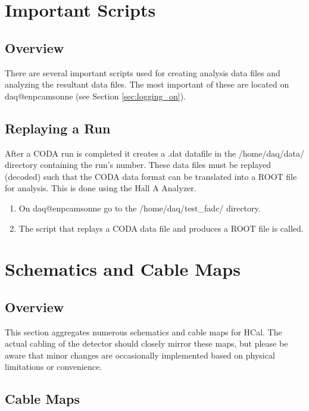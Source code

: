 \documentclass[oneside]{book}   %
\begin{document}
\chapter{Important Scripts}
\label{ch:scripts}

\section{Overview}
\label{sec:scripts_overview}

There are several important scripts used for creating analysis data files and analyzing the resultant data files. The most important of these are located on daq@enpcamsonne (see Section \cref{sec:logging_on}).

\section{Replaying a Run}
\label{sec:replay}

After a CODA run is completed it creates a .dat datafile in the /home/daq/data/ directory containing the run's number. These data files must be replayed (decoded) such that the CODA data format can be translated into a ROOT file for analysis. This is done using the Hall A Analyzer.

\begin{enumerate}
	\item On daq@enpcamsonne go to the /home/daq/test\_fadc/ directory. 
	\item The script that replays a CODA data file and produces a ROOT file is called. 
\end{enumerate}

\chapter{Schematics and Cable Maps}
\label{ch:schematics}

\section{Overview}
\label{sec:schematics_overview}

This section aggregates numerous schematics and cable maps for HCal. The actual cabling of the detector should closely mirror these maps, but please be aware that minor changes are occasionally implemented based on physical limitations or convenience. 

\section{Cable Maps}
\label{sec:cable_maps}
\end{document}
